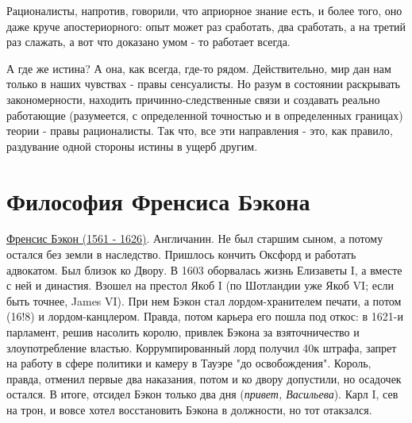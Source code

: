 Рационалисты, напротив, говорили, что априорное знание есть, и более того, оно даже круче апостериорного: опыт может раз сработать, два сработать, а на третий раз слажать, а вот что доказано умом - то работает всегда.

А где же истина? А она, как всегда, где-то рядом. Действительно, мир дан нам только в наших чувствах - правы сенсуалисты. Но разум в состоянии раскрывать закономерности, находить причинно-следственные связи и создавать реально работающие (разумеется, с определенной точностью и в определенных границах) теории - правы рационалисты. Так что, все эти направления - это, как правило, раздувание одной стороны истины в ущерб другим.

\section{Философия Френсиса Бэкона}
\underline{Френсис Бэкон (1561 - 1626)}. Англичанин. Не был старшим сыном, а потому остался без земли в наследство. Пришлось кончить Оксфорд и работать адвокатом. Был близок ко Двору. В 1603 оборвалась жизнь Елизаветы I, а вместе с ней и династия. Взошел на престол Якоб I (по Шотландии уже Якоб VI; если быть точнее, James VI). При нем Бэкон стал лордом-хранителем печати, а потом (16!8) и лордом-канцлером. Правда, потом карьера его пошла под откос: в 1621-и парламент, решив насолить королю, привлек Бэкона за взяточничество и злоупотребление властью. Коррумпированный лорд получил 40к штрафа, запрет на работу в сфере политики и камеру в Тауэре "до освобождения". Король, правда, отменил первые два наказания, потом и ко двору допустили, но осадочек остался. В итоге, отсидел Бэкон только два дня (\textit{привет, Васильева}). Карл I, сев на трон, и вовсе хотел восстановить Бэкона в должности, но тот отакзался.

